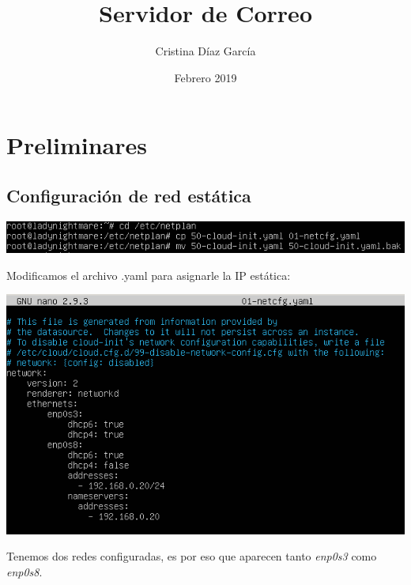 \documentclass{article}
\title{Servidor de Correo}
\author{Cristina Díaz García}
\date{Febrero 2019}
\begin{document}

\begin{titlingpage}
\maketitle
\end{titlingpage}

\newpage

\tableofcontents

\newpage

\section{Preliminares}

\subsection{Configuración de red estática}

\begin{center}
\includegraphics[scale=0.6]{images/estatica.png}
\end{center}

Modificamos el archivo .yaml para asignarle la IP estática:

\begin{center}
\includegraphics[scale=0.6]{images/yaml.png}
\end{center}

Tenemos dos redes configuradas, es por eso que aparecen tanto \textit{enp0s3} como \textit{enp0s8}.
\end{document}
